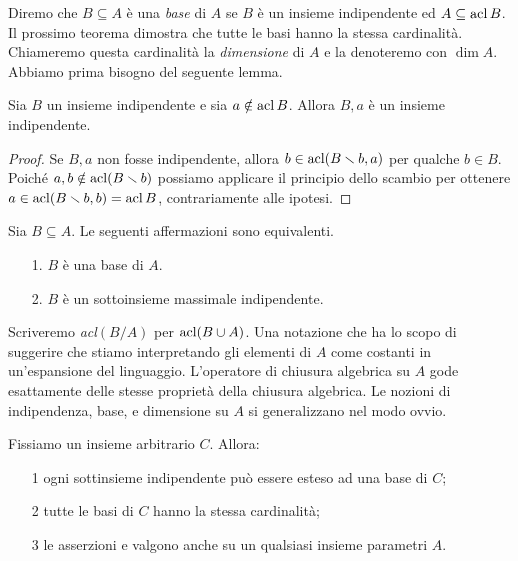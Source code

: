 Diremo che $B\subseteq A$ \`e una \emph{base\/} di $A$ se $B$ \`e un insieme indipendente ed $A\subseteq\mathop{\rm acl} B$. Il prossimo teorema dimostra che tutte le basi hanno la stessa cardinalit\`a. Chiameremo questa cardinalit\`a la \emph{dimensione\/} di $A$ e la denoteremo con \emph{$\dim A$}. Abbiamo prima bisogno del seguente lemma.

\begin{lemma}\label{indipendenza+1}
Sia $B$ un insieme indipendente e sia $a\notin \mathop{\rm acl} B$. Allora $B,a$ \`e un insieme indipendente.
\end{lemma}
\begin{proof}
Se $B,a$ non fosse indipendente, allora $b\in\mathop{\rm acl}(B\smallsetminus b,a)$ per qualche $b\in B$. Poich\'e $a,b\notin\mathop{\rm acl}(B\smallsetminus b)$ possiamo applicare il principio dello scambio per ottenere $a\in\mathop{\rm acl}(B\smallsetminus b,b)=\mathop{\rm acl} B$, contrariamente alle ipotesi.
\end{proof}

\begin{corollary}\label{basemassimale}
Sia $B\subseteq A$. Le seguenti affermazioni sono equivalenti.
\begin{itemize}
\item[1.] $B$ \`e una base di $A$.
\item[2.] $B$ \`e un sottoinsieme massimale indipendente.\QED
\end{itemize}
\end{corollary}

Scriveremo \emph{acl$(B/A)$\/} per $\mathop{\rm acl}(B\cup A)$. Una notazione che ha lo scopo di suggerire che stiamo interpretando gli elementi di $A$ come costanti in un'espansione del linguaggio. L'operatore di chiusura algebrica su $A$ gode esattamente delle stesse propriet\`a della chiusura algebrica. Le nozioni di indipendenza, base, e dimensione su $A$ si generalizzano nel modo ovvio.

\begin{theorem} Fissiamo un insieme arbitrario $C$. Allora:
\begin{itemize}
\item[1] ogni sottinsieme indipendente pu\`o essere esteso ad una base di $C$;
\item[2] tutte le basi di $C$ hanno la stessa cardinalit\`a;
\item[3] le asserzioni  e  valgono anche su un qualsiasi insieme parametri $A$.
\end{itemize}
\end{theorem}

